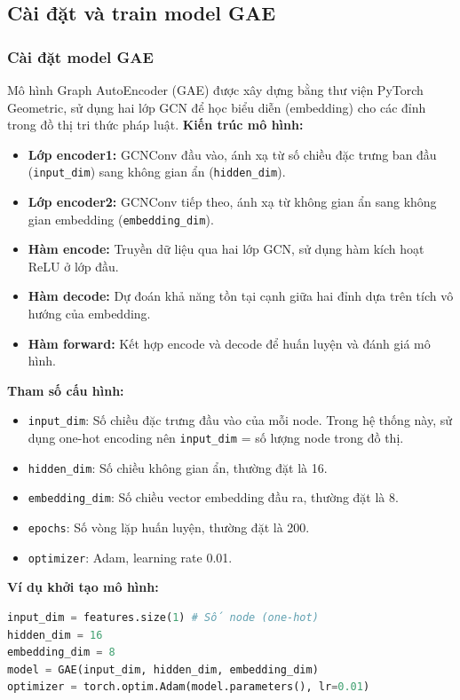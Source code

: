 \documentclass[a4paper]{article}
\begin{document}
\subsection{Cài đặt và train model GAE}
\subsubsection{Cài đặt model GAE}
Mô hình Graph AutoEncoder (GAE) được xây dựng bằng thư viện PyTorch Geometric, sử dụng hai lớp GCN để học biểu diễn (embedding) cho các đỉnh trong đồ thị tri thức pháp luật.
\textbf{Kiến trúc mô hình:}
\begin{itemize}
\item \textbf{Lớp encoder1:} GCNConv đầu vào, ánh xạ từ số chiều đặc trưng ban đầu (\texttt{input\_dim}) sang không gian ẩn (\texttt{hidden\_dim}).
\item \textbf{Lớp encoder2:} GCNConv tiếp theo, ánh xạ từ không gian ẩn sang không gian embedding (\texttt{embedding\_dim}).
\item \textbf{Hàm encode:} Truyền dữ liệu qua hai lớp GCN, sử dụng hàm kích hoạt ReLU ở lớp đầu.
\item \textbf{Hàm decode:} Dự đoán khả năng tồn tại cạnh giữa hai đỉnh dựa trên tích vô hướng của embedding.
\item \textbf{Hàm forward:} Kết hợp encode và decode để huấn luyện và đánh giá mô hình.
\end{itemize}
\textbf{Tham số cấu hình:}
\begin{itemize}
\item \texttt{input\_dim}: Số chiều đặc trưng đầu vào của mỗi node. Trong hệ thống này, sử dụng one-hot encoding nên \texttt{input\_dim} = số lượng node trong đồ thị.
\item \texttt{hidden\_dim}: Số chiều không gian ẩn, thường đặt là 16.
\item \texttt{embedding\_dim}: Số chiều vector embedding đầu ra, thường đặt là 8.
\item \texttt{epochs}: Số vòng lặp huấn luyện, thường đặt là 200.
\item \texttt{optimizer}: Adam, learning rate 0.01.
\end{itemize}
\textbf{Ví dụ khởi tạo mô hình:}
\begin{lstlisting}[language=python]
input_dim = features.size(1) # Số node (one-hot)
hidden_dim = 16
embedding_dim = 8
model = GAE(input_dim, hidden_dim, embedding_dim)
optimizer = torch.optim.Adam(model.parameters(), lr=0.01)
\end{lstlisting}
\end{document}
